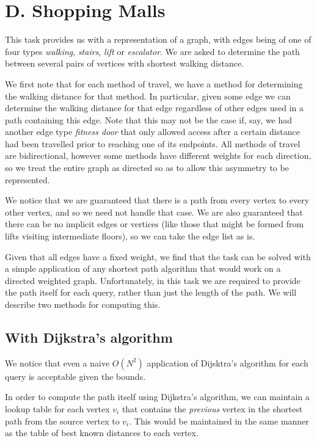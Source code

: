 \section*{D. Shopping Malls}

This task provides us with a representation of a graph, with edges being of one
of four types \emph{walking}, \emph{stairs}, \emph{lift} or \emph{escalator}.
We are asked to determine the path between several pairs of vertices with shortest
walking distance.

We first note that for each method of travel, we have a method for determining
the walking distance for that method. In particular, given some edge we can
determine the walking distance for that edge regardless of other edges used in
a path containing this edge. Note that this may not be the case if, say, we had
another edge type \emph{fitness door} that only allowed access after a certain
distance had been travelled prior to reaching one of its endpoints. All methods
of travel are bidirectional, however some methods have different weights for
each direction, so we treat the entire graph as directed so as to allow this
asymmetry to be represented.

We notice that we are guaranteed that there is a path from every vertex to
every other vertex, and so we need not handle that case. We are also guaranteed
that there can be no implicit edges or vertices (like those that might be
formed from lifts visiting intermediate floors), so we can take the edge list
as is.

Given that all edges have a fixed weight, we find that the task can be solved
with a simple application of any shortest path algorithm that would work on a
directed weighted graph. Unfortunately, in this task we are required to provide
the path itself for each query, rather than just the length of the path. We
will describe two methods for computing this.

\subsection*{With Dijkstra's algorithm}

We notice that even a naive $O(N^2)$ application of Dijsktra's algorithm for
each query is acceptable given the bounds.

In order to compute the path itself using Dijkstra's algorithm, we can maintain
a lookup table for each vertex $v_i$ that contains the \emph{previous} vertex
in the shortest path from the source vertex to $v_i$. This would be maintained
in the same manner as the table of best known distances to each vertex.

